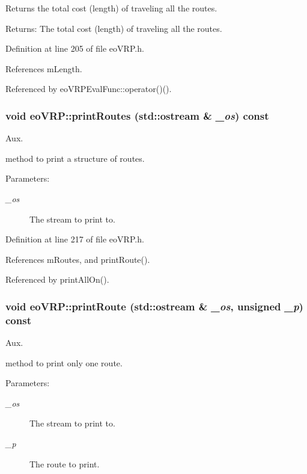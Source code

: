 Returns the total cost (length) of traveling all the routes. 

\begin{Desc}
\item[Returns:]The total cost (length) of traveling all the routes. \end{Desc}


Definition at line 205 of file eo\-VRP.h.

References m\-Length.

Referenced by eo\-VRPEval\-Func::operator()().
\subsubsection{\setlength{\rightskip}{0pt plus 5cm}void eo\-VRP::print\-Routes (std::ostream \& {\em \_\-os}) const\hspace{0.3cm}{\tt  [inline]}}\label{classeo_v_r_p_2a4c249cc6b15819c48c9210db385dc7}


Aux. 

method to print a structure of routes. \begin{Desc}
\item[Parameters:]
\begin{description}
\item[{\em \_\-os}]The stream to print to. \end{description}
\end{Desc}


Definition at line 217 of file eo\-VRP.h.

References m\-Routes, and print\-Route().

Referenced by print\-All\-On().
\subsubsection{\setlength{\rightskip}{0pt plus 5cm}void eo\-VRP::print\-Route (std::ostream \& {\em \_\-os}, unsigned {\em \_\-p}) const\hspace{0.3cm}{\tt  [inline]}}\label{classeo_v_r_p_ec256ed5b3b15b6d220494015e2aba93}


Aux. 

method to print only one route. \begin{Desc}
\item[Parameters:]
\begin{description}
\item[{\em \_\-os}]The stream to print to. \item[{\em \_\-p}]The route to print. \end{description}
\end{Desc}


